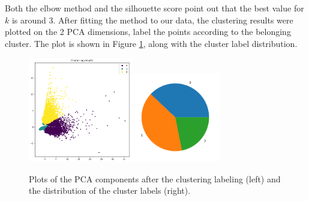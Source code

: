 \documentclass[10pt,a4paper]{report}
\begin{document}
Both the elbow method and the silhouette score point out that the best value for $k$ is around 3.
After fitting the method to our data, the clustering results were plotted on the 2 PCA dimensions, label the points according to the belonging cluster.
The plot is shown in Figure \ref{kmeans_pca}, along with the cluster label distribution.
\begin{figure}[h]
	\centering
	\includegraphics[width=0.4\textwidth]{kmeans_pca}\includegraphics[width=0.35\textwidth]{kmeans_pie}
	\caption{Plots of the PCA components after the clustering labeling (left) and the distribution of the cluster labels (right).}
	\label{kmeans_pca}
\end{figure}
\end{document}
